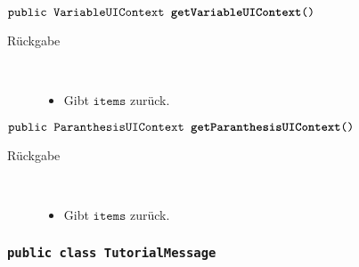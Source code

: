 \begin{description}
		\item $\texttt{public VariableUIContext \textbf{getVariableUIContext}()}$ \\ 
		\begin{description}
			\item[Rückgabe] \hfill \\
			\vspace{-.8cm}
			\begin{itemize}
				\item Gibt $\texttt{items}$ zurück.
			\end{itemize}
			\end{description}
			
		\item $\texttt{public ParanthesisUIContext \textbf{getParanthesisUIContext}()}$ \\ 
		\begin{description}
			\item[Rückgabe] \hfill \\
			\vspace{-.8cm}
			\begin{itemize}
				\item Gibt $\texttt{items}$ zurück.
			\end{itemize}
			\end{description}

		
	\end{description}


\subsubsection{\normalfont \texttt{public class \textbf{TutorialMessage}}}

